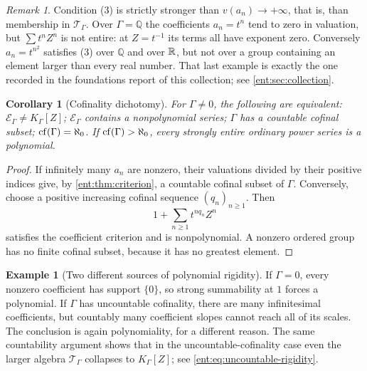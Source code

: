 \documentclass[11pt]{article}
\theoremstyle{plain}
\theoremstyle{plain}
\theoremstyle{plain}
\newtheorem{corollary}[corollary]{Corollary}
\theoremstyle{definition}
\theoremstyle{definition}
\theoremstyle{definition}
\newtheorem{example}[example]{Example}
\theoremstyle{definition}
\theoremstyle{remark}
\newtheorem{remark}[remark]{Remark}
\newcommand{\Q}{\mathbb Q}\newcommand{\Z}{\mathbb Z}\newcommand{\N}{\mathbb N}
\newcommand{\K}{K_\Gamma}\newcommand{\KD}{K_\Delta}
\newcommand{\E}{\mathcal E_\Gamma}
\newcommand{\TT}{\mathcal T_\Gamma}
\begin{document}
\begin{remark}\label{ent:rem:criterion-strength}
Condition (3) is strictly stronger than $v(a_n)\to+\infty$, that is, than
membership in $\TT$. Over $\Gamma=\Q$ the coefficients $a_n=t^n$ tend to zero
in valuation, but $\sum t^nZ^n$ is not entire: at $Z=t^{-1}$ its terms all
have exponent zero. Conversely $a_n=t^{n^2}$ satisfies (3) over $\Q$ and over
$\mathbb R$, but not over a group containing an element larger than every real
number. That last example is exactly the one recorded in the foundations
report of this collection; see \cref{ent:sec:collection}.
\end{remark}

\begin{corollary}[Cofinality dichotomy]\label{ent:cor:cofinality}
For $\Gamma\ne0$, the following are equivalent: $\E\ne\K[Z]$; $\E$ contains a
nonpolynomial series; $\Gamma$ has a countable cofinal subset;
$\operatorname{cf}(\Gamma)=\aleph_0$. If $\operatorname{cf}(\Gamma)>\aleph_0$, every strongly entire
ordinary power series is a polynomial.
\end{corollary}
\begin{proof}
If infinitely many $a_n$ are nonzero, their valuations divided by their
positive indices give, by \cref{ent:thm:criterion}, a countable cofinal
subset of $\Gamma$. Conversely, choose a positive increasing cofinal sequence
$(q_n)_{n\ge1}$. Then
\[
 1+\sum_{n\ge1}t^{nq_n}Z^n
\]
satisfies the coefficient criterion and is nonpolynomial. A nonzero ordered
group has no finite cofinal subset, because it has no greatest element.
\end{proof}

\begin{example}[Two different sources of polynomial rigidity]
\label{ent:ex:two-rigidities}
If $\Gamma=0$, every nonzero coefficient has support $\{0\}$, so strong
summability at $1$ forces a polynomial. If $\Gamma$ has uncountable
cofinality, there are many infinitesimal coefficients, but countably many
coefficient slopes cannot reach all of its scales. The conclusion is again
polynomiality, for a different reason. The same countability argument shows
that in the uncountable-cofinality case even the larger algebra $\TT$
collapses to $\K[Z]$; see \eqref{ent:eq:uncountable-rigidity}.
\end{example}
\end{document}
